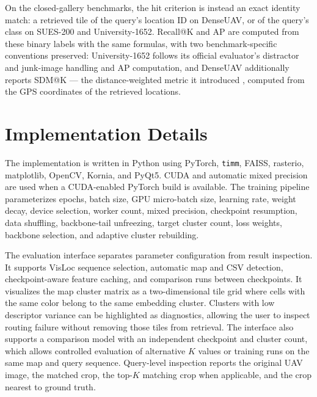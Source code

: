 \documentclass[conference]{IEEEtran}
\begin{document}
On the closed-gallery benchmarks, the hit criterion is instead an exact
identity match: a retrieved tile of the query's location ID on DenseUAV, or
of the query's class on SUES-200 and University-1652. Recall@K and AP are
computed from these binary labels with the same formulas, with two
benchmark-specific conventions preserved: University-1652 follows its
official evaluator's distractor and junk-image handling and AP computation,
and DenseUAV additionally reports SDM@K — the distance-weighted metric it
introduced \cite{dai2024denseuav}, computed from the GPS coordinates of the
retrieved locations.

\section{Implementation Details}
The implementation is written in Python using PyTorch, \texttt{timm}, FAISS,
rasterio, matplotlib, OpenCV, Kornia, and PyQt5. CUDA and automatic mixed
precision are used when a CUDA-enabled PyTorch build is available. The
training pipeline parameterizes epochs, batch size, GPU micro-batch size,
learning rate, weight decay, device selection, worker count, mixed precision,
checkpoint resumption, data shuffling, backbone-tail unfreezing,
target cluster count, loss weights, backbone selection, and
adaptive cluster rebuilding.

The evaluation interface separates parameter configuration from result
inspection. It supports VisLoc sequence selection, automatic map and CSV
detection, checkpoint-aware feature caching, and
comparison runs between checkpoints. It visualizes the map cluster matrix as a
two-dimensional tile grid where cells with the same color belong to the same
embedding cluster.
Clusters with low descriptor variance can be highlighted as diagnostics,
allowing the user to inspect routing failure without removing those tiles from
retrieval. The interface also
supports a comparison model with an independent checkpoint and cluster count,
which allows controlled evaluation of alternative $K$ values or training runs
on the same map and query sequence.
Query-level inspection reports the original UAV image, the matched crop, the
top-$K$ matching crop when applicable, and the crop nearest to ground truth.
\end{document}
